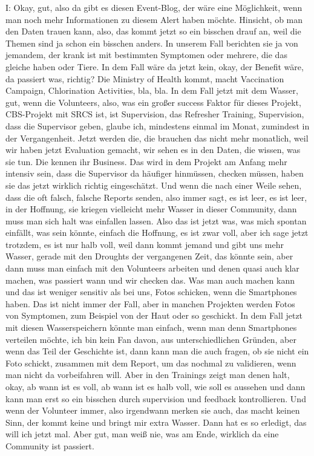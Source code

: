 I: Okay, gut, also da gibt es diesen Event-Blog, der w{\"a}re eine M{\"o}glichkeit, wenn man noch mehr Informationen zu diesem Alert haben m{\"o}chte. Hinsicht, ob man den Daten trauen kann, also, das kommt jetzt so ein bisschen drauf an, weil die Themen sind ja schon ein bisschen anders. In unserem Fall berichten sie ja von jemandem, der krank ist mit bestimmten Symptomen oder mehrere, die das gleiche haben oder Tiere. In dem Fall w{\"a}re da jetzt kein, okay, der Benefit w{\"a}re, da passiert was, richtig? Die Ministry of Health kommt, macht Vaccination Campaign, Chlorination Activities, bla, bla. In dem Fall jetzt mit dem Wasser, gut, wenn die Volunteers, also, was ein großer success Faktor f{\"u}r dieses Projekt, CBS-Projekt mit SRCS ist, ist Supervision, das Refresher Training, Supervision, dass die Supervisor geben, glaube ich, mindestens einmal im Monat, zumindest in der Vergangenheit. Jetzt werden die, die brauchen das nicht mehr monatlich, weil wir haben jetzt Evaluation gemacht, wir sehen es in den Daten, die wissen, was sie tun. Die kennen ihr Business. Das wird in dem Projekt am Anfang mehr intensiv sein, dass die Supervisor da h{\"a}ufiger hinm{\"u}ssen, checken m{\"u}ssen, haben sie das jetzt wirklich richtig eingesch{\"a}tzt. Und wenn die nach einer Weile sehen, dass die oft falsch, falsche Reports senden, also immer sagt, es ist leer, es ist leer, in der Hoffnung, sie kriegen vielleicht mehr Wasser in dieser Community, dann muss man sich halt was einfallen lassen. Also das ist jetzt was, was mich spontan einf{\"a}llt, was sein k{\"o}nnte, einfach die Hoffnung, es ist zwar voll, aber ich sage jetzt trotzdem, es ist nur halb voll, weil dann kommt jemand und gibt uns mehr Wasser, gerade mit den Droughts der vergangenen Zeit, das k{\"o}nnte sein, aber dann muss man einfach mit den Volunteers arbeiten und denen quasi auch klar machen, was passiert wann und wir checken das. Was man auch machen kann und das ist weniger sensitiv als bei uns, Fotos schicken, wenn die Smartphones haben. Das ist nicht immer der Fall, aber in manchen Projekten werden Fotos von Symptomen, zum Beispiel von der Haut oder so geschickt. In dem Fall jetzt mit diesen Wasserspeichern k{\"o}nnte man einfach, wenn man denn Smartphones verteilen m{\"o}chte, ich bin kein Fan davon, aus unterschiedlichen Gr{\"u}nden, aber wenn das Teil der Geschichte ist, dann kann man die auch fragen, ob sie nicht ein Foto schickt, zusammen mit dem Report, um das nochmal zu validieren, wenn man nicht da vorbeifahren will. Aber in den Trainings zeigt man denen halt, okay, ab wann ist es voll, ab wann ist es halb voll, wie soll es aussehen und dann kann man erst so ein bisschen durch supervision und feedback kontrollieren. Und wenn der Volunteer immer, also irgendwann merken sie auch, das macht keinen Sinn, der kommt keine und bringt mir extra Wasser. Dann hat es so erledigt, das will ich jetzt mal. Aber gut, man weiß nie, was am Ende, wirklich da eine Community ist passiert. 

